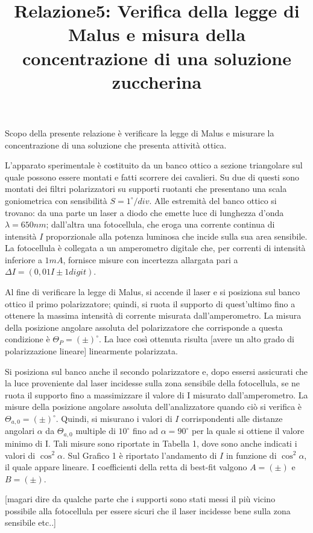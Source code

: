 \documentclass{article}
\title{Relazione5: Verifica della legge di Malus e misura della concentrazione di una soluzione zuccherina}
\date{}
\begin{document}
		
	\maketitle
	
	Scopo della presente relazione è verificare la legge di Malus e misurare la concentrazione di una soluzione che presenta attività ottica. 
	
	L'apparato sperimentale è costituito da un banco ottico a sezione triangolare sul quale possono essere montati e fatti scorrere dei cavalieri. Su due di questi sono montati dei filtri polarizzatori su supporti ruotanti che presentano una scala goniometrica con sensibilità $S=1^{\circ}/div$. Alle estremità del banco ottico si trovano: da una parte un laser a diodo che emette luce di lunghezza d'onda $\lambda=650nm$; dall'altra una fotocellula, che eroga una corrente continua di intensità $I$ proporzionale alla potenza luminosa che incide sulla sua area sensibile. La fotocellula è collegata a un amperometro digitale che, per correnti di intensità inferiore a $1mA$, fornisce misure con incertezza allargata pari a $\Delta I = (0,01 I \pm 1 digit)$.
	
	Al fine di verificare la legge di Malus, si accende il laser e si posiziona sul banco ottico il primo polarizzatore; quindi, si ruota il supporto di quest'ultimo fino a ottenere la massima intensità di corrente misurata dall'amperometro. La misura della posizione angolare assoluta del polarizzatore che corrisponde a questa condizione è $\Theta_P=(\pm)^{\circ}$.
	La luce così ottenuta risulta [avere un alto grado di polarizzazione lineare] linearmente polarizzata.
	
	Si posiziona sul banco anche il secondo polarizzatore e, dopo essersi assicurati che la luce proveniente dal laser incidesse sulla zona sensibile della fotocellula, se ne ruota il supporto fino a massimizzare il valore di I misurato dall'amperometro. La misure della posizione angolare assoluta dell'analizzatore quando ciò si verifica è $\Theta_{a,0}=(\pm)^{\circ}$. Quindi, si misurano i valori di $I$ corrispondenti alle distanze angolari $\alpha$ da $\Theta_{a,0}$ multiple di $10^{\circ}$ fino ad $\alpha=90^{\circ}$ per la quale si ottiene il valore minimo di I. Tali misure sono riportate in Tabella 1, dove sono anche indicati i valori di $\cos^2\alpha$. Sul Grafico 1 è riportato l'andamento di $I$ in funzione di $\cos^2\alpha$, il quale appare lineare. I coefficienti della retta di best-fit valgono $A=(\pm)$ e $B=(\pm)$.
	
	[magari dire da qualche parte che i supporti sono stati messi il più vicino possibile alla fotocellula per essere sicuri che il laser incidesse bene sulla zona sensibile etc..]
	
\end{document}
